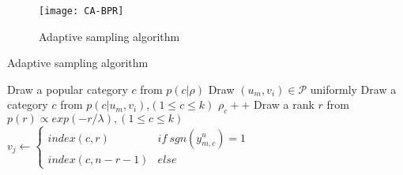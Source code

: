 \begin{frame}
	\begin{figure}
			\texttt{[image: CA-BPR]}
	\caption{Adaptive sampling algorithm}
	\end{figure}
\end{frame}


\begin{frame}{Adaptive sampling algorithm}
	\IncMargin{1em}
	\begin{algorithm}[H]%
		\SetAlgoNoLine %
		Draw a popular category $c$ from $p\left(c|\rho\right)$\;
		Draw $\left(u_m,v_i\right) \in \mathcal{P}$ uniformly\;
		Draw a category $c$ from $p\left(c|u_m,v_i\right)$,$\left(1\leq c \leq k\right)$\;
		$\rho_c ++$\;
		Draw a rank $r$ from $p\left(r\right) \propto exp\left(-r/\lambda\right),\left(1\leq c \leq k\right)$\;
		$v_j \leftarrow 
		\begin{cases}
		index\left(c,r\right) & if \ sgn\left(y_{m,c}^u\right) = 1\\
		index\left(c,n-r-1\right) & else
		\end{cases}$\;
		\caption{Content-aware and Adaptive sampling}
		\label{algo:sampling}
	\end{algorithm}
	\DecMargin{1em}
\end{frame}



